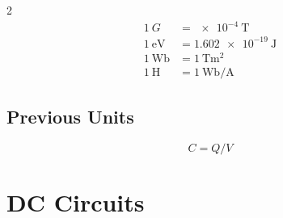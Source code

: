 \begin{multicols*}{2}
\begin{align*}
    \qty{1}{G}              &= \qty{e-4}{\tesla}                \\[4pt]
    \qty{1}{\electronvolt}  &= \qty{1.602e-19}{\joule}          \\[4pt]
    \qty{1}{\weber}         &= \qty{1}{\tesla\square\meter}     \\[4pt]
    \qty{1}{\henry}         &= \qty{1}{\weber\per\ampere}
\end{align*}

\subsection{Previous Units}

\begin{equation*}
    C = Q/V
\end{equation*}


\section{DC Circuits}


\end{multicols*}
